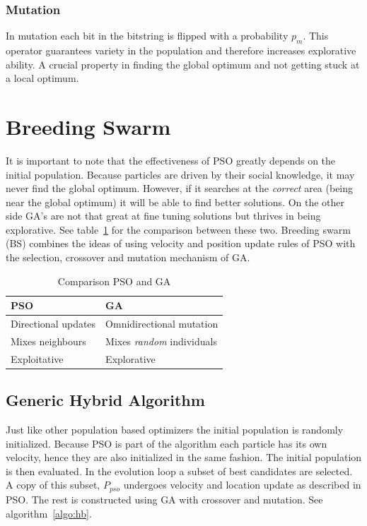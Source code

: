 \documentclass{acm_proc_article-sp}
\begin{document}
\subsubsection{Mutation}
In mutation each bit in the bitstring is flipped with a probability $p_m$. This operator guarantees variety in the population and therefore increases explorative ability. A crucial property in finding the global optimum and not getting stuck at a local optimum.

\section{Breeding Swarm}\label{sec:bs}
It is important to note that the effectiveness of PSO greatly depends on the initial population. Because particles are driven by their social knowledge, it may never find the global optimum. However, if it searches at the \emph{correct} area (being near the global optimum) it will be able to find better solutions. On the other side GA's are not that great at fine tuning solutions but thrives in being explorative. See table~\ref{tbl:compare} for the comparison between these two. Breeding swarm (BS) combines the ideas of using velocity and position update rules of PSO with the selection, crossover and mutation mechanism of GA.
\begin{table}[h]
    \begin{tabularx}{0.47\textwidth}{|X|X|}
    \hline
    \textbf{PSO} & \textbf{GA} \\
    \hline
    Directional updates & Omnidirectional mutation\\
    Mixes neighbours & Mixes \emph{random} individuals\\
    Exploitative & Explorative\\
    \hline
    \end{tabularx}
    \caption{Comparison PSO and GA}\label{tbl:compare}
\end{table}

\subsection{Generic Hybrid Algorithm}
Just like other population based optimizers the initial population is randomly initialized. Because PSO is part of the algorithm each particle has its own velocity, hence they are also initialized in the same fashion. The initial population is then evaluated. In the evolution loop a subset of best candidates are selected. A copy of this subset, $P_{pso}$ undergoes velocity and location update as described in PSO. The rest is constructed using GA with crossover and mutation. See algorithm~\ref{algo:hb}.
\end{document}

